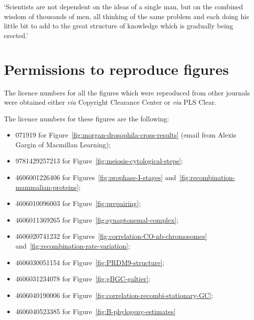 \begin{savequote}[8cm]

	‘Scientists are not dependent on the ideas of a single man, but on the combined wisdom of thousands of men, all thinking of the same problem and each doing his little bit to add to the great structure of knowledge which is gradually being erected.’

\end{savequote}

\chapter{\label{app:permissions}Permissions to reproduce figures}

\minitoc{}


The licence numbers for all the figures which were reproduced from other journals were obtained either \textit{via} Copyright Clearance Center or \textit{via} PLS Clear.

The licence numbers for these figures are the following:

\begin{itemize}
	\item{071919 for Figure~\ref{fig:morgan-drosophila-cross-results} (email from Alexis Gargin of Macmillan Learning);}
	\item{9781429257213 for Figure~\ref{fig:meiosis-cytological-steps};}
	\item{4606001226406 for Figures~\ref{fig:prophase-I-stages} and~\ref{fig:recombination-mammalian-proteins};}
	\item{4606010096003 for Figure~\ref{fig:prepairing};}
	\item{4606011369265 for Figure~\ref{fig:synaptonemal-complex};}

	\item{4606020741232 for Figures~\ref{fig:correlation-CO-nb-chromosomes} and~\ref{fig:recombination-rate-variation};}
	\item{4606030051154 for Figure~\ref{fig:PRDM9-structure};}

	\item{4606031234078 for Figure~\ref{fig:gBGC-galtier};}
	\item{4606040190006 for Figure~\ref{fig:correlation-recombi-stationary-GC};}
	\item{4606040523385 for Figure~\ref{fig:B-phylogeny-estimates}}

\end{itemize}

